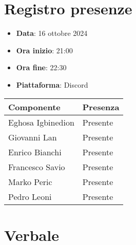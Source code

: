 \documentclass[a4paper, 12pt]{article}
\begin{document}
\section{Registro presenze}
\begin{itemize}
    \item[] \textbf{Data}: 16 ottobre 2024
    \item[] \textbf{Ora inizio}:  21:00
    \item[] \textbf{Ora fine}: 22:30
    \item[] \textbf{Piattaforma}: Discord	
\end{itemize}
\begin{table}[!h]
\centering
{\renewcommand{\arraystretch}{2}
\begin{tabularx}{\textwidth}{| X | X |}
    \hline
        \textbf{\large Componente} & 
        \textbf{\large Presenza} \\ 
    \hline 
    \hline
        Eghosa Igbinedion&
        Presente \\
    \hline 
        Giovanni Lan&
        Presente \\
    \hline 
        Enrico Bianchi&
        Presente \\
    \hline 
        Francesco Savio&
        Presente \\
    \hline 
        Marko Peric&
        Presente \\
    \hline 
        Pedro Leoni&
        Presente \\
    \hline 

\end{tabularx}}
\end{table}

\newpage

\section{Verbale}
\end{document}
